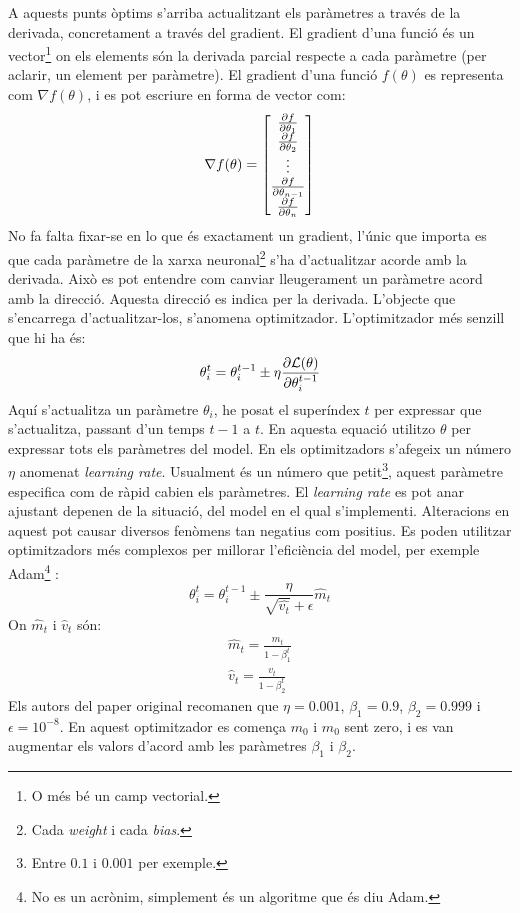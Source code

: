 A aquests punts òptims s'arriba actualitzant els paràmetres a través de la derivada, concretament a través del gradient. El gradient d'una funció és un vector\footnote{O més bé un camp vectorial.} on els elements són la derivada parcial respecte a cada paràmetre (per aclarir, un element per paràmetre). El gradient d'una funció $f(\theta)$ es representa com $\nabla f(\theta)$, i es pot escriure en forma de vector com:
$$
\nabla f(\theta) = \begin{bmatrix}
	\pdv{f}{\theta_1} \\
	\pdv{f}{\theta_2} \\
	\vdots \\
	\pdv{f}{\theta_{n-1}} \\
	\pdv{f}{\theta_{n}}
\end{bmatrix}
$$
No fa falta fixar-se en lo que és exactament un gradient, l'únic que importa es que cada paràmetre de la xarxa neuronal\footnote{Cada \textit{weight} i cada \textit{bias}.} s'ha d'actualitzar acorde amb la derivada. Això es pot entendre com canviar lleugerament un paràmetre acord amb la direcció. Aquesta direcció es indica per la derivada. L'objecte que s'encarrega d'actualitzar-los, s'anomena optimitzador. L'optimitzador més senzill que hi ha és:
$$
\theta_{i}^t = \theta_{i}^{t-1} \pm \eta\pdv{\mathcal{L}(\theta)}{\theta_{i}^{t-1}}
$$
Aquí s'actualitza un paràmetre $\theta_i$, he posat el superíndex $t$ per expressar que s'actualitza, passant d'un temps $t-1$ a $t$. En aquesta equació utilitzo $\theta$ per expressar tots els paràmetres del model. En els optimitzadors s'afegeix un número $\eta$ anomenat \textit{learning rate}. Usualment és un número que petit\footnote{Entre $0.1$ i $0.001$ per exemple.}, aquest paràmetre especifica com de ràpid cabien els paràmetres. El \textit{learning rate} es pot anar ajustant depenen de la situació, del model en el qual s'implementi. Alteracions en aquest pot causar diversos fenòmens tan negatius com positius. Es poden utilitzar optimitzadors més complexos per millorar l'eficiència del model, per exemple Adam\footnote{No es un acrònim, simplement és un algoritme que és diu Adam. } \cite{adam}:
$$
\theta_{i}^t = \theta_{i}^{t-1} \pm \frac{\eta}{\sqrt{\hat{v_t}}+\epsilon}\hat{m}_t
$$
On $\hat{m}_t$ i $\hat{v}_t$ són:
\begin{align*}
	\hat{m}_t = \frac{m_t}{1-\beta^t_1} \\
	\hat{v}_t = \frac{v_t}{1-\beta^t_2}
\end{align*}
Els autors del paper original recomanen que $\eta = 0.001$, $\beta_1 = 0.9$, $\beta_2=0.999$ i $\epsilon=10^{-8}$. En aquest optimitzador es comença $m_0$ i $m_0$ sent zero, i es van augmentar els valors d'acord amb les paràmetres $\beta_1$ i $\beta_2$. 

